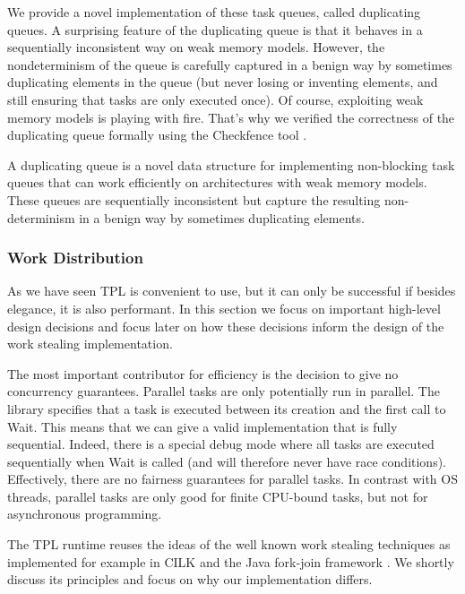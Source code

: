 We provide a novel implementation of these task queues, called
duplicating queues. A surprising feature of the duplicating queue is
that it behaves in a sequentially inconsistent way on weak memory
models. However, the nondeterminism of the queue is carefully captured
in a benign way by sometimes duplicating elements in the queue (but
never losing or inventing elements, and still ensuring that tasks are
only executed once). Of course, exploiting weak memory models is
playing with fire. That's why we verified the correctness of the
duplicating queue formally using the Checkfence tool
\cite{Burckhardt2007, Burckhardt2007a}.

A duplicating queue is a novel data structure for implementing
non-blocking task queues that can work efficiently on architectures
with weak memory models. These queues are sequentially inconsistent
but capture the resulting non-determinism in a benign way by sometimes
duplicating elements.

\subsubsection{Work Distribution}

As we have seen TPL is convenient to use, but it can only be
successful if besides elegance, it is also performant. In this section
we focus on important high-level design decisions and focus later on
how these decisions inform the design of the work stealing
implementation.


The most important contributor for efficiency is the decision to give
no concurrency guarantees. Parallel tasks are only potentially run in
parallel. The library specifies that a task is executed between its
creation and the first call to Wait. This means that we can give a
valid implementation that is fully sequential. Indeed, there is a
special debug mode where all tasks are executed sequentially when Wait
is called (and will therefore never have race
conditions). Effectively, there are no fairness guarantees for
parallel tasks. In contrast with OS threads, parallel tasks are only
good for finite CPU-bound tasks, but not for asynchronous programming.


The TPL runtime reuses the ideas of the well known work stealing
techniques as implemented for example in CILK \cite{Frigo1998,
  Danaher2005} and the Java fork-join framework \cite{Lea2000,
  Lea2000a, Lea2004, Lea2006}. We shortly discuss its principles and
focus on why our implementation differs.


